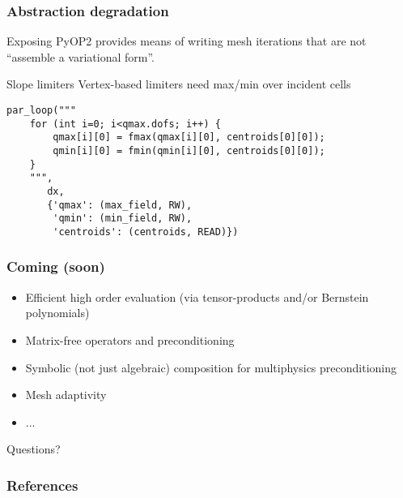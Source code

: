 \documentclass[presentation]{beamer}
\begin{document}
\begin{frame}[fragile]
  \frametitle{Abstraction degradation}
  Exposing PyOP2 provides means of writing mesh iterations that are
  not ``assemble a variational form''.

  \begin{exampleblock}{Slope limiters}
    Vertex-based limiters need max/min over incident cells
\begin{verbatim}
par_loop("""
    for (int i=0; i<qmax.dofs; i++) {
        qmax[i][0] = fmax(qmax[i][0], centroids[0][0]);
        qmin[i][0] = fmin(qmin[i][0], centroids[0][0]);
    }
    """,
       dx,
       {'qmax': (max_field, RW),
        'qmin': (min_field, RW),
        'centroids': (centroids, READ)})
\end{verbatim}
  \end{exampleblock}
\end{frame}

\begin{frame}
  \frametitle{Coming (soon)}
  \begin{itemize}
  \item Efficient high order evaluation (via tensor-products and/or
    Bernstein polynomials)
  \item Matrix-free operators and preconditioning
  \item Symbolic (not just algebraic) composition for multiphysics
    preconditioning
  \item Mesh adaptivity
  \item ...
  \end{itemize}
\end{frame}

\begin{frame}[standout]
  Questions?
\end{frame}

\appendix
\begin{frame}[allowframebreaks]
  \frametitle{References}
  \printbibliography[heading=none]
\end{frame}
\end{document}
